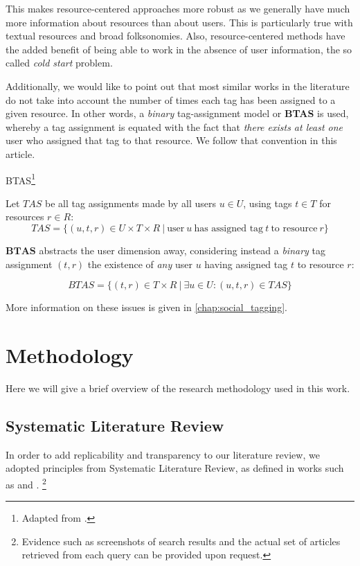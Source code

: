 This makes resource-centered approaches more robust as we generally have much more information about resources than about users. This is particularly true with textual resources and broad folksonomies. Also, resource-centered methods have the added benefit of being able to work in the absence of user information, the so called \textit{cold start} problem.

Additionally, we would like to point out that most similar works in the literature do not take into account the number of times each tag has been assigned to a given resource. In other words, a \textit{binary} tag-assignment model or \textbf{BTAS} \citep{illig_etal_2011} is used, whereby a tag assignment is equated with the fact that \textit{there exists at least one} user who assigned that tag to that resource. We follow that convention in this article.

\begin{definition}{BTAS}\footnote{Adapted from \cite{illig_etal_2011}.}

Let $TAS$ be all tag assignments made by all users $u \in U$, using tags $t \in T$ for resources $r \in R$:
\[ TAS = \{ (u,t,r) \in  U \times T \times R \ | \ \text{user} \ u \ \text{has assigned tag} \ t \ \text{to resource} \ r \} \]  

$\mathbf{BTAS}$ abstracts the user dimension away, considering instead a \textit{binary} tag assignment $(t,r)$ the existence of \textit{any} user $u$ having assigned tag $t$ to resource $r$:

\[ BTAS = \{(t,r) \in T \times R \ | \ \exists u \in U : (u,t,r) \in TAS \}  \]

\end{definition}

More information on these issues is given in \autoref{chap:social_tagging}.

\section{Methodology}\label{section:intro_methodology}

Here we will give a brief overview of the research methodology used in this work.

\subsection{Systematic Literature Review}\label{section:literature_review}

In order to add replicability and transparency to our literature review, we adopted principles from Systematic Literature Review, as defined in works such as \cite{baumeister_leary_1997} and \cite{bem_1995}. \footnote{Evidence such as screenshots of search results and the actual set of articles retrieved from each query can be provided upon request.}


